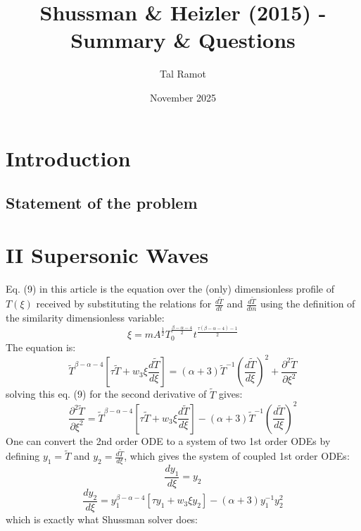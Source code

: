 \documentclass[11pt]{article}
\title{Shussman \& Heizler (2015) - Summary \& Questions}
\author{Tal Ramot}
\date{November 2025}
\begin{document}
\maketitle

\section{Introduction}
\subsection{Statement of the problem}

\section{II Supersonic Waves}
Eq. (9) in this article is the equation over the (only) dimensionless profile of $T(\xi)$ received by substituting the relations for $\frac{d\tilde{T}}{dt}$ and $\frac{d\tilde{T}}{dm}$ using the definition of the similarity dimensionless variable:
\begin{equation}
  \xi = mA^{\frac{1}{2}} T_0^{\frac{\beta - \alpha - 4}{2}} t^{\frac{\tau(\beta - \alpha - 4)-1}{2}}
\end{equation} 
The equation is:
\begin{equation}
  \tilde{T}^{\beta - \alpha - 4} \left[\tau \tilde{T} + w_3 \xi \frac{d\tilde{T}}{d\xi}\right] = \left(\alpha+3\right)\tilde{T}^{-1} \left(\frac{d\tilde{T}}{d\xi}\right)^2 + \frac{\partial^2\tilde{T}}{\partial \xi^2}
\end{equation}
solving this eq. (9) for the second derivative of $\tilde{T}$ gives:
\begin{equation}
  \frac{\partial^2\tilde{T}}{\partial \xi^2} = \tilde{T}^{\beta - \alpha - 4} \left[\tau \tilde{T} + w_3 \xi \frac{d\tilde{T}}{d\xi}\right] - \left(\alpha+3\right)\tilde{T}^{-1} \left(\frac{d\tilde{T}}{d\xi}\right)^2
\end{equation}
One can convert the 2nd order ODE to a system of two 1st order ODEs by defining $y_1 = \tilde{T}$ and $y_2 = \frac{d\tilde{T}}{d\xi}$, which gives the system of coupled 1st order ODEs:
\begin{equation}
  \frac{dy_1}{d\xi} = y_2
\end{equation}
\begin{equation}
  \frac{dy_2}{d\xi} = y_1^{\beta - \alpha - 4} \left[\tau y_1 + w_3 \xi y_2\right] - \left(\alpha+3\right)y_1^{-1} y_2^2
\end{equation}
which is exactly what Shussman solver does:
\end{document}
